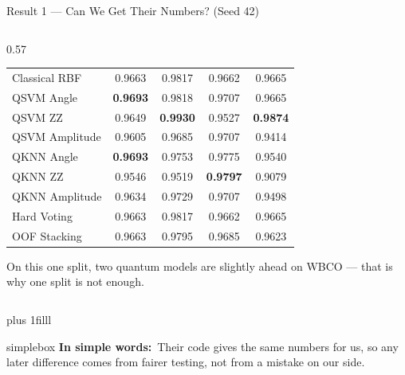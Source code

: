 \documentclass[aspectratio=169,11pt,t,xcolor={table}]{beamer}
\newcommand{\insimple}[1]{%
  \par\vskip 0pt plus 1filll
  \begin{beamercolorbox}[wd=\textwidth,sep=4pt,rounded=true]{simplebox}%
    \small\textbf{\textcolor{qamber!75!black}{In simple words:}}\ #1%
  \end{beamercolorbox}\vskip1pt}
\begin{document}
\begin{frame}{Result 1 --- Can We Get Their Numbers? (Seed 42)}
\begin{columns}[T,onlytextwidth]
\begin{column}{0.57\textwidth}
\begin{tabular}{@{}lcccc@{}}
        \midrule
        \rowcolor{qnavy!8} Classical RBF & 0.9663 & 0.9817 & 0.9662 & 0.9665 \\
        QSVM Angle     & \textbf{0.9693} & 0.9818 & 0.9707 & 0.9665 \\
        QSVM ZZ        & 0.9649 & \textbf{0.9930} & 0.9527 & \textbf{0.9874} \\
        QSVM Amplitude & 0.9605 & 0.9685 & 0.9707 & 0.9414 \\
        QKNN Angle     & \textbf{0.9693} & 0.9753 & 0.9775 & 0.9540 \\
        QKNN ZZ        & 0.9546 & 0.9519 & \textbf{0.9797} & 0.9079 \\
        QKNN Amplitude & 0.9634 & 0.9729 & 0.9707 & 0.9498 \\
        Hard Voting    & 0.9663 & 0.9817 & 0.9662 & 0.9665 \\
        \rowcolor{qred!8} OOF Stacking & 0.9663 & 0.9795 & 0.9685 & 0.9623 \\
        \bottomrule
      \end{tabular}\par
      \vspace{1mm}
      {\scriptsize On this one split, two quantum models are slightly ahead on WBCO --- that is why one split is not enough.}
    \end{column}
  \end{columns}
  \insimple{Their code gives the same numbers for us, so any later difference comes from fairer testing, not from a mistake on our side.}
\end{frame}
\end{document}
